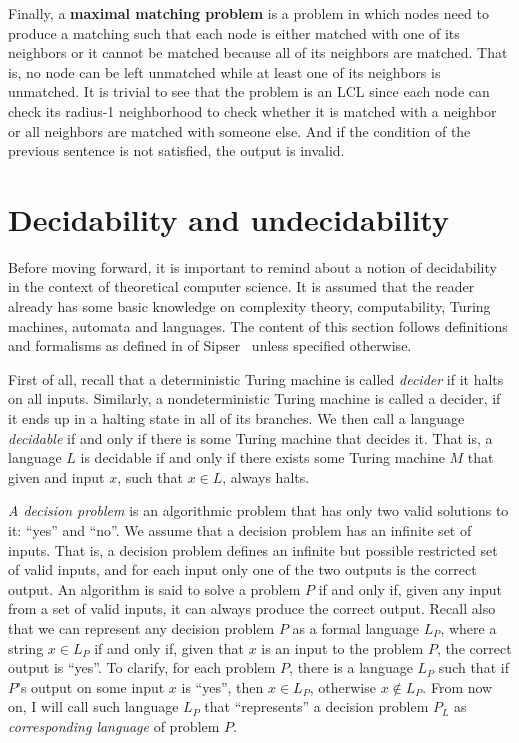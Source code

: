 Finally, a \textbf{maximal matching problem} is a problem in which nodes need to
produce a matching such that each node is either matched with one of 
its neighbors or it cannot be matched because all of its neighbors are
matched. That is, no node can be left unmatched while at least one of its
neighbors is unmatched. It is trivial to see that the problem is an LCL
since each node can check its radius-1 neighborhood to check whether it
is matched with a neighbor or all neighbors are matched with someone else.
And if the condition of the previous sentence is not satisfied, the output
is invalid.

\section{Decidability and undecidability}

Before moving forward, it is important to remind about a notion of
decidability in the context of theoretical computer science. It is
assumed that the reader already has some basic knowledge on
complexity theory, computability, Turing machines, automata and
languages. The content of this section follows
definitions and formalisms as defined in of Sipser~\cite{Sipser2012}
unless specified otherwise.

First of all, recall that a deterministic Turing machine is called
\emph{decider} if it halts on all inputs. Similarly,
a nondeterministic Turing machine is called a decider, if
it ends up in a halting state in all of its branches. We then
call a language \emph{decidable} if and only if there is some Turing
machine that decides it. That is, a language $L$ is decidable
if and only if there exists some Turing machine $M$ that given
and input $x$, such that $x \in L$, always halts.

\emph{A decision problem} is an algorithmic problem that has only two
valid solutions to it: ``yes'' and ``no''. We assume that a decision
problem has an infinite set of inputs. That is, a decision problem
defines an infinite but possible restricted set of valid inputs,
and for each input only one of the two outputs is the correct
output. An algorithm is said to solve a problem $P$ if and only
if, given any input from a set of valid inputs, it can
always produce the correct output. Recall also that we can
represent any decision problem $P$ as a formal language $L_P$, where
a string $x \in L_P$ if and only if, given that $x$ is an input
to the problem $P$, the correct output is ``yes''. To clarify,
for each problem $P$, there is a language $L_P$ such that
if $P$'s output on some input $x$ is ``yes'', then $x \in L_P$,
otherwise $x \notin L_P$. From now on, I will call such
language $L_P$ that ``represents'' a decision problem $P_L$ as
\emph{corresponding language} of problem $P$.

